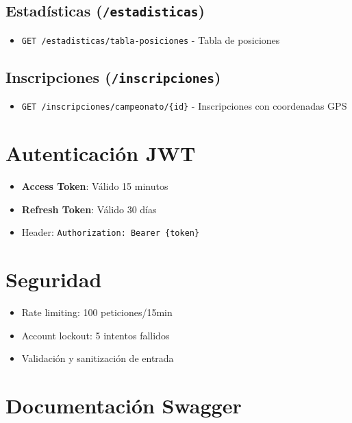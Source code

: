 \documentclass[
  spanish,
  11pt,
  letterpaper,
]{book}
\providecommand{\tightlist}{%
  \setlength{\itemsep}{0pt}\setlength{\parskip}{0pt}}
\begin{document}
\subsection{\texorpdfstring{Estadísticas
(\texttt{/estadisticas})}{Estadísticas (/estadisticas)}}\label{estaduxedsticas-estadisticas}

\begin{itemize}
\tightlist
\item
  \texttt{GET\ /estadisticas/tabla-posiciones} - Tabla de posiciones
\end{itemize}

\subsection{\texorpdfstring{Inscripciones
(\texttt{/inscripciones})}{Inscripciones (/inscripciones)}}\label{inscripciones-inscripciones}

\begin{itemize}
\tightlist
\item
  \texttt{GET\ /inscripciones/campeonato/\{id\}} - Inscripciones con
  coordenadas GPS
\end{itemize}

\section{Autenticación JWT}\label{autenticaciuxf3n-jwt}

\begin{itemize}
\tightlist
\item
  \textbf{Access Token}: Válido 15 minutos
\item
  \textbf{Refresh Token}: Válido 30 días
\item
  Header: \texttt{Authorization:\ Bearer\ \{token\}}
\end{itemize}

\section{Seguridad}\label{seguridad-1}

\begin{itemize}
\tightlist
\item
  Rate limiting: 100 peticiones/15min
\item
  Account lockout: 5 intentos fallidos
\item
  Validación y sanitización de entrada
\end{itemize}

\section{Documentación Swagger}\label{documentaciuxf3n-swagger}
\end{document}
